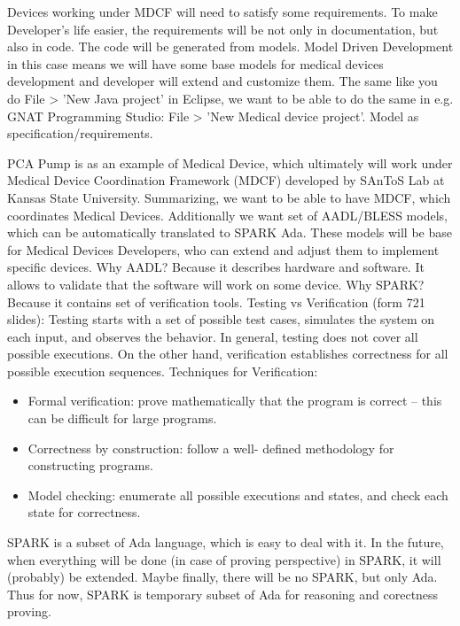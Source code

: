 Devices working under MDCF will need to satisfy some requirements. To make Developer's life easier, the requirements will be not only in documentation, but also in code. The code will be generated from models.
Model Driven Development in this case means we will have some base models for medical devices development and developer will extend and customize them. The same like you do File > 'New Java project' in Eclipse, we want to be able to do the same in e.g. GNAT Programming Studio: File > 'New Medical device project'.
Model as specification/requirements.

PCA Pump is as an example of Medical Device, which ultimately will work under Medical Device Coordination Framework (MDCF) developed by SAnToS Lab at Kansas State University.
Summarizing, we want to be able to have MDCF, which coordinates Medical Devices. Additionally we want set of AADL/BLESS models, which can be automatically translated to SPARK Ada. These models will be base for Medical Devices Developers, who can extend and adjust them to implement specific devices. 
Why AADL? Because it describes hardware and software. It allows to validate that the software will work on some device.
Why SPARK? Because it contains set of verification tools. 
Testing vs Verification (form 721 slides): Testing starts with a set of possible test cases, simulates the system on each input, and observes the behavior. In general, testing does not cover all possible executions. On the other hand, verification establishes correctness for all possible execution sequences.
Techniques for Verification:
\begin{itemize}
	\item Formal verification: prove mathematically that the program is correct – this can be difficult for large programs.
	\item Correctness by construction: follow a well- defined methodology for constructing programs.
	\item Model checking: enumerate all possible executions and states, and check each state for correctness.
\end{itemize}
SPARK is a subset of Ada language, which is easy to deal with it. In the future, when everything will be done (in case of proving perspective) in SPARK, it will (probably) be extended. Maybe finally, there will be no SPARK, but only Ada. Thus for now, SPARK is temporary subset of Ada for reasoning and corectness proving.


